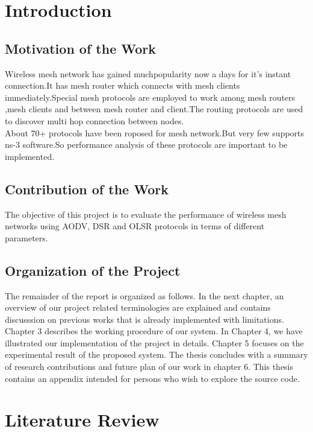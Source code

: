 \documentclass[12pt,a4paper]{report}
\begin{document}
\chapter{Introduction}
\section{Motivation of the Work}
Wireless mesh network has gained muchpopularity now a days for it’s instant connection.It has mesh router which connects with mesh clients immediately.Special mesh protocols are employed to work among mesh routers ,mesh clients and between mesh router and client.The routing protocols are used to discover multi hop connection between nodes.\\
About 70+ protocols have been roposed for mesh network.But very few supports ns-3 software.So performance analysis of these protocols are important to be implemented.


\section{Contribution of the Work}
The objective of this project is to evaluate the performance of wireless mesh networks
using AODV, DSR and OLSR protocols in terms of different parameters. 


\section{Organization of the Project}
The remainder of the report is organized as follows. In the next chapter, an overview of our project related terminologies are explained and contains  discusssion on previous works that is already implemented with  limitations. Chapter 3 describes the working procedure of our  system. In Chapter 4, we have illustrated our implementation of the project in details. Chapter 5 focuses on the experimental result of the proposed system. The thesis concludes with a summary of research contributions and future plan of our work in chapter 6. This thesis contains an appendix intended for persons who wish to explore the source code.



\chapter{Literature Review}
\end{document}
